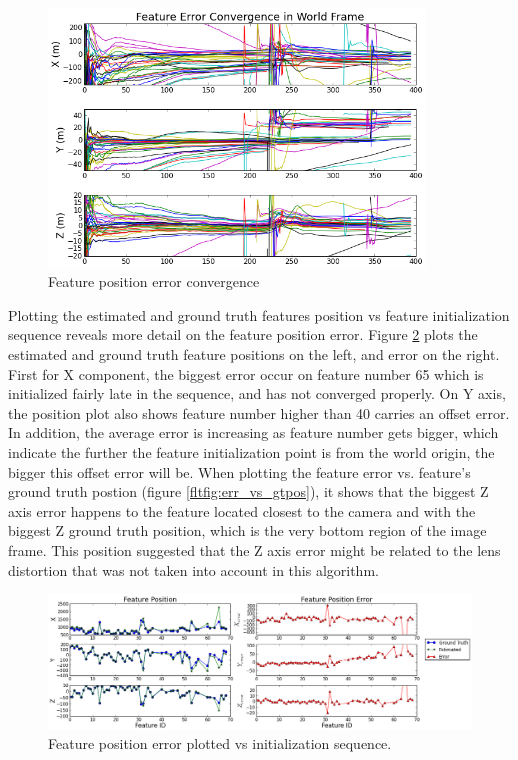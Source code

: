 \begin{figure}[h]
\centering
\includegraphics[width=10cm, keepaspectratio=true]
{./Figures/fltfig/cut1/Figure50.png}
\caption{Feature position error convergence}
\label{fltfig:8}
\end{figure}

Plotting the estimated and ground truth features position vs feature
initialization sequence reveals more detail on the feature position
error. Figure \ref{fltfig:9} plots the estimated and ground truth
feature positions on the left, and error on the right. First for X
component, the biggest error occur on feature number 65 which is
initialized fairly late in the sequence, and has not converged
properly. On Y axis, the position plot also shows feature number
higher than 40 carries an offset error. In addition, the average error
is increasing as feature number gets bigger, which indicate the
further the feature initialization point is from the world origin, the
bigger this offset error will be. When plotting the feature error vs.
feature's ground truth postion (figure \ref{fltfig:err_vs_gtpos}), it
shows that the biggest Z axis error happens to the feature located
closest to the camera and with the biggest Z ground truth position,
which is the very bottom region of the image frame. This position
suggested that the Z axis error might be related to the lens
distortion that was not taken into account in this algorithm.

\begin{figure}[h]
\centering
\includegraphics[width=14cm, keepaspectratio=true]
{./Figures/fltfig/cut1/Figure60.png}
\caption{Feature position error plotted vs initialization sequence. }
\label{fltfig:9}
\end{figure}

